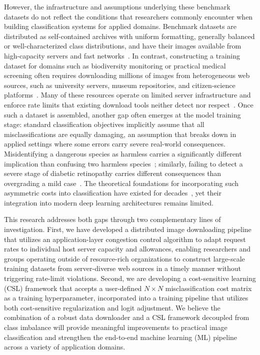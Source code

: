 \documentclass[11pt, letterpaper]{article}
\begin{document}
However, the infrastructure and assumptions underlying these benchmark datasets do not reflect the conditions that researchers commonly encounter when building classification systems for applied domains. Benchmark datasets are distributed as self-contained archives with uniform formatting, generally balanced or well-characterized class distributions, and have their images available from high-capacity servers and fast networks~\cite{torralba2011unbiased}. In contrast, constructing a training dataset for domains such as biodiversity monitoring or practical medical screening often requires downloading millions of images from heterogeneous web sources, such as university servers, museum repositories, and citizen-science platforms~\cite{yang2024biotrove}. Many of these resources operate on limited server infrastructure and enforce rate limits that existing download tools neither detect nor respect~\cite{deng2025flowdc}. Once such a dataset is assembled, another gap often emerges at the model training stage: standard classification objectives implicitly assume that all misclassifications are equally damaging, an assumption that breaks down in applied settings where some errors carry severe real-world consequences. Misidentifying a dangerous species as harmless carries a significantly different implication than confusing two harmless species~\cite{deng2026aranet}; similarly, failing to detect a severe stage of diabetic retinopathy carries different consequences than overgrading a mild case~\cite{galdran2020}. The theoretical foundations for incorporating such asymmetric costs into classification have existed for decades~\cite{elkan2001}, yet their integration into modern deep learning architectures remains limited.

This research addresses both gaps through two complementary lines of investigation. First, we have developed a distributed image downloading pipeline that utilizes an application-layer congestion control algorithm to adapt request rates to individual host server capacity and allowances, enabling researchers and groups operating outside of resource-rich organizations to construct large-scale training datasets from server-diverse web sources in a timely manner without triggering rate-limit violations. Second, we are developing a cost-sensitive learning (CSL) framework that accepts a user-defined $N \times N$ misclassification cost matrix as a training hyperparameter, incorporated into a training pipeline that utilizes both cost-sensitive regularization and logit adjustment. We believe the combination of a robust data downloader and a CSL framework decoupled from class imbalance will provide meaningful improvements to practical image classification and strengthen the end-to-end machine learning (ML) pipeline across a variety of application domains.
\end{document}
